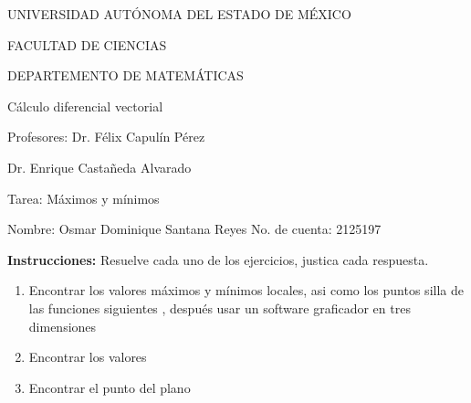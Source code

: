 \documentclass[fleqn]{article}
\begin{document}
    \begin{center}
        UNIVERSIDAD AUTÓNOMA DEL ESTADO DE MÉXICO

        \vspace{-2mm}
        FACULTAD DE CIENCIAS
        
        \vspace{-2mm}
        DEPARTEMENTO DE MATEMÁTICAS
        
        \vspace{-2mm}
        Cálculo diferencial vectorial
        
        \vspace{-2mm}
        Profesores: Dr. Félix Capulín Pérez
        
        \vspace{-2mm}
        Dr. Enrique Castañeda Alvarado
        
        \vspace{-2mm}
        Tarea: Máximos y mínimos
    \end{center}

    Nombre: Osmar Dominique Santana Reyes \hfill No. de cuenta: 2125197

    \textbf{Instrucciones: } Resuelve cada uno de los ejercicios, justica cada respuesta.

    \begin{enumerate}
        \item Encontrar los valores máximos y mínimos locales, asi como los puntos silla de las funciones siguientes , después usar un software graficador en tres dimensiones
        \item Encontrar los valores
        \item Encontrar el punto del plano
    \end{enumerate}
\end{document}
